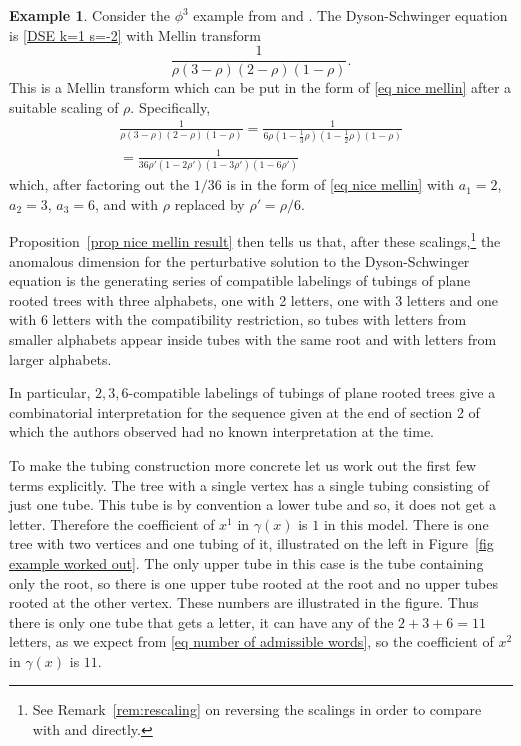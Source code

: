 \documentclass[oneside]{amsart}
\theoremstyle{definition}
\newtheorem{example}[thm]{Example}
\begin{document}
\begin{example}\label{eg phi3}
  Consider the $\phi^3$ example from \cite{bkerfc} and \cite{BDM}.  The Dyson-Schwinger equation is \eqref{DSE k=1 s=-2} with Mellin transform
  \[
  \frac{1}{\rho(3-\rho)(2-\rho)(1-\rho)}.
  \]
  This is a Mellin transform which can be put in the form of \eqref{eq nice mellin} after a suitable scaling of $\rho$.  Specifically,
  \begin{gather*} \frac{1}{\rho(3-\rho)(2-\rho)(1-\rho)} = \frac{1}{6\rho(1-\frac{1}{3}\rho)(1-\frac{1}{2}\rho)(1-\rho)} \\
 = \frac{1}{36 \rho'(1-2 \rho')(1-3\rho')(1-6\rho')} \end{gather*}
  which, after factoring out the $1/36$ is
  in the form of \eqref{eq nice mellin} with $a_1 = 2$, $a_2=3$, $a_3 = 6$, and with $\rho$ replaced by $\rho'=\rho/6$.  

  Proposition~\ref{prop nice mellin result} then tells us that, after these scalings,\footnote{See Remark~\ref{rem:rescaling} on reversing the scalings in order to compare with \cite{bkerfc} and \cite{BDM} directly.} the anomalous dimension for the perturbative solution to the Dyson-Schwinger equation is the generating series of compatible labelings of tubings of plane rooted trees with three alphabets, one with 2 letters, one with 3 letters and one with 6 letters with the compatibility restriction, so tubes with letters from smaller alphabets appear inside tubes with the same root and with letters from larger alphabets.

  In particular, $2,3,6$-compatible labelings of tubings of plane rooted trees give a combinatorial interpretation for the sequence given at the end of section 2 of \cite{BDM} which the authors observed had no known interpretation at the time.

  To make the tubing construction more concrete let us work out the first few terms explicitly.  The tree with a single vertex has a single tubing consisting of just one tube.  This tube is by convention a lower tube and so, it does not get a letter.  Therefore the coefficient of $x^1$ in $\gamma(x)$ is $1$ in this model.  There is one tree with two vertices and one tubing of it, illustrated on the left in Figure~\ref{fig example worked out}.  The only upper tube in this case is the tube containing only the root, so there is one upper tube rooted at the root and no upper tubes rooted at the other vertex. These numbers are illustrated in the figure.  Thus there is only one tube that gets a letter, it can have any of the $2+3+6=11$ letters, as we expect from \eqref{eq number of admissible words}, so the coefficient of $x^2$ in $\gamma(x)$ is $11$.  


\end{example}
\end{document}
